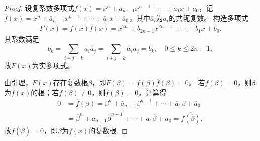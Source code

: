 \documentclass[../../main.tex]{subfiles}%
\begin{document}
\begin{proof}
设复系数多项式$f(x)=x^n+a_{n-1}x^{n-1}+\cdots+a_1x+a_0$，记$\overline{f}(x)=x^n+\overline{a}_{n-1}x^{n-1}+\cdots+\overline{a}_1x+\overline{a}_0$，其中$\overline{a}_i$为$a_i$的共轭复数。
构造多项式
\begin{align}
F(x)=f(x)\overline{f}(x)=x^{2n}+b_{2n-1}x^{2n-1}+\cdots+b_1x+b_0.\label{eq:F-poly}
\end{align}
其系数满足
$$b_k=\sum\limits_{i+j=k}a_i\overline{a}_j=\sum\limits_{i+j=k}\overline{a}_i a_j=\overline{b}_k,\quad 0\leqslant k\leqslant 2n-1,$$
故$F(x)$为实多项式。

由引理，$F(x)$存在复数根$\beta$，即$F(\beta)=f(\beta)\overline{f}(\beta)=0$。
若$f(\beta)=0$，则$\beta$为$f(x)$的根；若$f(\beta)\neq0$，则$\overline{f}(\beta)=0$，计算得
\begin{align*}
0&=\overline{f}(\beta)=\beta^n+\overline{a}_{n-1}\beta^{n-1}+\cdots+\overline{a}_1\beta+\overline{a}_0\\
&=\overline{\overline{\beta}^n+a_{n-1}\overline{\beta}^{n-1}+\cdots+a_1\overline{\beta}+a_0}=\overline{f(\overline{\beta})},
\end{align*}
故$f(\overline{\beta})=0$，即$\overline{\beta}$为$f(x)$的复数根.
\end{proof}
\end{document}
